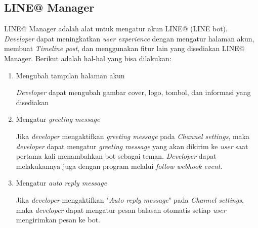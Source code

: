 \subsection{LINE@ Manager}
LINE@ Manager adalah alat untuk mengatur akun LINE@ (LINE bot). \textit{Developer} dapat meningkatkan \textit{user experience} dengan mengatur halaman akun, membuat \textit{Timeline post}, dan menggunakan fitur lain yang disediakan LINE@ Manager. Berikut adalah hal-hal yang bisa dilakukan:
\begin{enumerate}
\item Mengubah tampilan halaman akun

\textit{Developer} dapat mengubah gambar cover, logo, tombol, dan informasi yang disediakan

\item Mengatur \textit{greeting message}

Jika \textit{developer} mengaktifkan \textit{greeting message} pada \textit{Channel settings}, maka \textit{developer} dapat mengatur \textit{greeting message} yang akan dikirim ke \textit{user} saat pertama kali menambahkan bot sebagai teman. \textit{Developer} dapat melakukannya juga dengan program melalui \textit{follow webhook event}.

\item Mengatur \textit{auto reply message}

Jika \textit{developer} mengaktifkan "\textit{Auto reply message}" pada \textit{Channel settings}, maka \textit{developer} dapat mengatur pesan balasan otomatis setiap \textit{user} mengirimkan pesan ke bot.
\end{enumerate}
